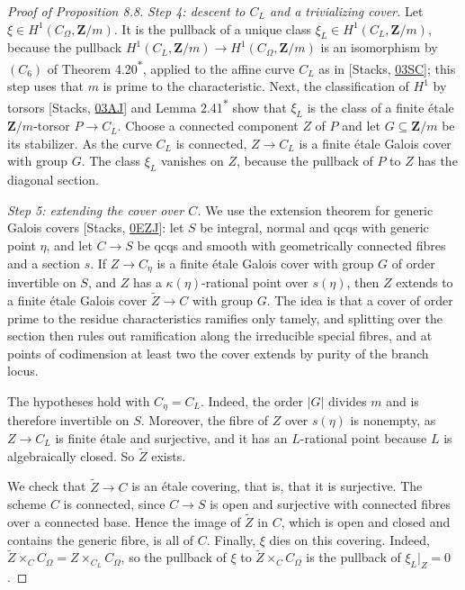 \documentclass[11pt]{article}
\newcommand{\bpout}[1]{#1\textsuperscript{\hyperlink{bp-outside}{\ensuremath{\ast}}}}
\begin{document}
\begin{proof}[{Proof of Proposition 8.8}]
\emph{Step 4: descent to \(C_L\) and a trivializing cover.} Let \(\xi\in H^1(C_\Omega,\mathbf Z/m)\). It is the pullback of a unique class \(\xi_L\in H^1(C_L,\mathbf Z/m)\), because the pullback \(H^1(C_L,\mathbf Z/m)\to H^1(C_\Omega,\mathbf Z/m)\) is an isomorphism by \((C_6)\) of Theorem \bpout{4.20}, applied to the affine curve \(C_L\) as in [Stacks, \href{https://stacks.math.columbia.edu/tag/03SC}{03SC}]; this step uses that \(m\) is prime to the characteristic. Next, the classification of \(H^1\) by torsors [Stacks, \href{https://stacks.math.columbia.edu/tag/03AJ}{03AJ}] and Lemma \bpout{2.41} show that \(\xi_L\) is the class of a finite étale \(\mathbf Z/m\)-torsor \(P\to C_L\). Choose a connected component \(Z\) of \(P\) and let \(G\subseteq\mathbf Z/m\) be its stabilizer. As the curve \(C_L\) is connected, \(Z\to C_L\) is a finite étale Galois cover with group \(G\). The class \(\xi_L\) vanishes on \(Z\), because the pullback of \(P\) to \(Z\) has the diagonal section.

\emph{Step 5: extending the cover over \(C\).} We use the extension theorem for generic Galois covers [Stacks, \href{https://stacks.math.columbia.edu/tag/0EZJ}{0EZJ}]: let \(S\) be integral, normal and qcqs with generic point \(\eta\), and let \(C\to S\) be qcqs and smooth with geometrically connected fibres and a section \(s\). If \(Z\to C_\eta\) is a finite étale Galois cover with group \(G\) of order invertible on \(S\), and \(Z\) has a \(\kappa(\eta)\)-rational point over \(s(\eta)\), then \(Z\) extends to a finite étale Galois cover \(\widetilde Z\to C\) with group \(G\). The idea is that a cover of order prime to the residue characteristics ramifies only tamely, and splitting over the section then rules out ramification along the irreducible special fibres, and at points of codimension at least two the cover extends by purity of the branch locus.

The hypotheses hold with \(C_\eta=C_L\). Indeed, the order \(|G|\) divides \(m\) and is therefore invertible on \(S\). Moreover, the fibre of \(Z\) over \(s(\eta)\) is nonempty, as \(Z\to C_L\) is finite étale and surjective, and it has an \(L\)-rational point because \(L\) is algebraically closed. So \(\widetilde Z\) exists.

We check that \(\widetilde Z\to C\) is an étale covering, that is, that it is surjective. The scheme \(C\) is connected, since \(C\to S\) is open and surjective with connected fibres over a connected base. Hence the image of \(\widetilde Z\) in \(C\), which is open and closed and contains the generic fibre, is all of \(C\). Finally, \(\xi\) dies on this covering. Indeed, \(\widetilde Z\times_C C_\Omega=Z\times_{C_L}C_\Omega\), so the pullback of \(\xi\) to \(\widetilde Z\times_CC_\Omega\) is the pullback of \(\xi_L|_Z=0\).
\end{proof}
\end{document}
